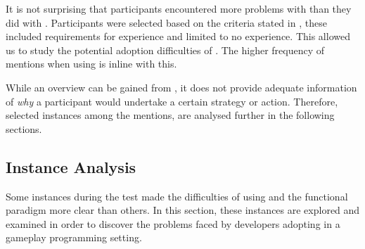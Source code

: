 It is not surprising that participants encountered more problems with \fs than they did with \cs. Participants were selected based on the criteria stated in , these included requirements for \cs experience and limited to no  \fs experience. This allowed us to study the potential adoption difficulties of \fs. The higher frequency of mentions when using \fs is inline with this.

While an overview can be gained from , it does not provide adequate information of \textit{why} a participant would undertake a certain strategy or action. Therefore, selected instances among the mentions, are analysed further in the following sections.

\subsection{Instance Analysis}
Some instances during the test made the difficulties of using \fs and the functional paradigm more clear than others. In this section, these instances are explored and examined in order to discover the problems faced by developers adopting \fs in a gameplay programming setting.%






